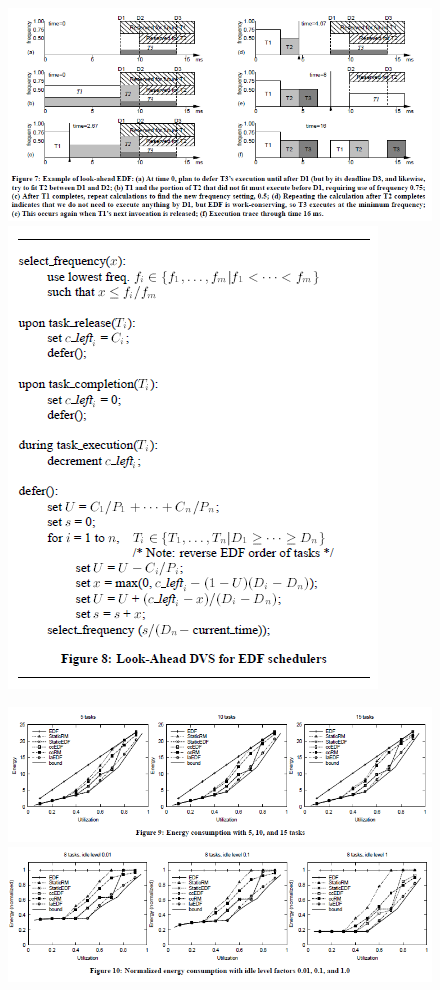 \documentclass[11pt
  , a4paper
  , article
  , oneside
]{memoir}
\begin{document}
\begin{figure}[h!]
	\centering
	\includegraphics{./images/fig07.png}
	\includegraphics{./images/fig08.png}
\end{figure}
\begin{figure}[h!]
	\centering
	\includegraphics{./images/fig09.png}
	\includegraphics{./images/fig10.png}	
\end{figure}
\end{document}

